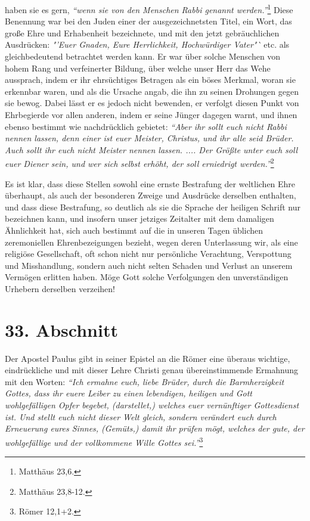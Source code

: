 haben sie es gern,
\textit{"`wenn sie von den Menschen Rabbi genannt
werden."'}\footnote{Matthäus 23,6.}
Diese Benennung war bei den Juden einer der
ausgezeichnetsten Titel, ein Wort, das große Ehre und Erhabenheit bezeichnete,
und mit den jetzt gebräuchlichen Ausdrücken: \textit{"'Euer Gnaden, Eure
Herrlichkeit, Hochwürdiger Vater"`} etc. als gleichbedeutend betrachtet werden
kann. Er war
über solche Menschen von hohem Rang und verfeinerter Bildung, über welche unser
Herr das Wehe aussprach, indem er ihr ehrsüchtiges Betragen als ein böses
Merkmal, woran sie erkennbar waren, und als die Ursache angab, die ihn zu seinen
Drohungen gegen sie bewog. Dabei lässt er es jedoch nicht bewenden, er verfolgt
diesen Punkt von Ehrbegierde vor allen anderen, indem er seine Jünger dagegen
warnt, und ihnen ebenso bestimmt wie nachdrücklich gebietet:
\textit{"`Aber ihr sollt
euch nicht Rabbi nennen lassen, denn einer ist euer Meister, Christus, und ihr
alle seid Brüder. Auch sollt ihr euch nicht Meister nennen lassen. .... Der
Größte unter euch soll euer Diener sein, und wer sich selbst erhöht, der soll
erniedrigt werden."'}\footnote{Matthäus
23,8-12.}

\medskip

Es ist klar, dass diese Stellen sowohl eine ernste Bestrafung der weltlichen
Ehre
überhaupt, als auch der besonderen Zweige und Ausdrücke derselben enthalten, und
dass diese Bestrafung, so deutlich als sie die Sprache der heiligen Schrift nur
bezeichnen kann, und insofern unser jetziges Zeitalter mit dem damaligen
Ähnlichkeit hat, sich auch bestimmt auf die in unseren Tagen üblichen
zeremoniellen Ehrenbezeigungen bezieht, wegen deren Unterlassung wir, als eine
religiöse Gesellschaft, oft schon nicht nur persönliche Verachtung, Verspottung
und Misshandlung, sondern auch nicht selten Schaden und Verlust an unserem
Vermögen erlitten haben. Möge Gott solche Verfolgungen den unverständigen
Urhebern derselben verzeihen!

\section{33. Abschnitt} \label{kap9_ab33}

Der Apostel Paulus gibt in seiner Epistel an die Römer eine überaus wichtige,
eindrückliche und mit dieser Lehre Christi genau übereinstimmende Ermahnung mit
den Worten:
\textit{"`Ich ermahne euch, liebe Brüder, durch die Barmherzigkeit Gottes,
dass ihr euere Leiber zu einen lebendigen, heiligen und Gott wohlgefälligen
Opfer
begebet, (darstellet,) welches euer vernünftiger Gottesdienst ist. Und stellt
euch nicht dieser Welt gleich, sondern verändert euch durch Erneuerung eures
Sinnes, (Gemüts,) damit ihr prüfen mögt, welches der gute, der wohlgefällige
und der vollkommene Wille Gottes sei."'}\footnote{Römer 12,1+2.}

